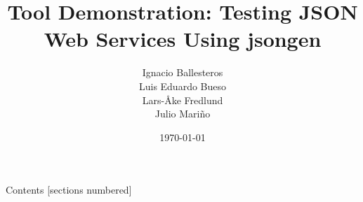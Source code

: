 \documentclass[10pt]{beamer}
\title{Tool Demonstration: Testing JSON Web Services Using jsongen}
\date{\today}
\author{
  Ignacio Ballesteros\\
  Luis Eduardo Bueso\\
  Lars-Åke Fredlund\\
  Julio Mariño
}
\institute{UPM}
\begin{document}
\maketitle

\begin{frame}{Contents}
  [sections numbered]
  \tableofcontents[hideallsubsections]
\end{frame}










\end{document}
